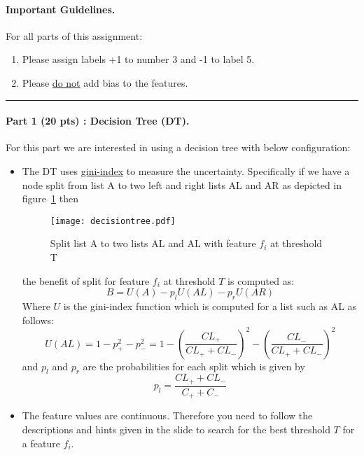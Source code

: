 \documentclass{article}
\begin{document}
{\paragraph{Important Guidelines.} {For all parts of this assignment:
\begin{enumerate}
\item Please assign labels +1 to number 3 and -1 to label 5.
\item Please \underline{do not} add bias to the features.
\end{enumerate}
}
\noindent\rule{16cm}{0.4pt}
\newpage
\paragraph{Part 1 (20 pts) : Decision Tree (DT).} For this part we are interested in using a decision tree with below configuration:
\begin{itemize}
\item The DT uses \underline{gini-index} to measure the uncertainty. Specifically if we have a node split from list A to two left and right lists AL and AR as depicted in figure~\ref{fig:dt_split} then
\begin{figure}[H]
\begin{center}
\texttt{[image: decisiontree.pdf]}
\end{center}
\caption{Split list A to two lists AL and AL with feature $f_i$ at threshold T}
\label{fig:dt_split}
\end{figure}
the benefit of split for feature $f_i$ at threshold $T$ is computed as:
\begin{equation}
B = U(A) - p_l U(AL) - p_r U(AR)
\label{eqpredict}
\end{equation}
Where $U$ is the gini-index function which is computed for a list such as AL as follows:
\begin{equation}
    U(AL) = 1 - p_{+}^{2} - p_{-}^{2} = 1 - (\frac{CL_{+}}{CL_{+} + CL_{-}})^{2} - (\frac{CL_{-}}{CL_{+} + CL_{-}})^{2}
\end{equation}
and $p_l$ and $p_r$ are the probabilities for each split which is given by \\
\begin{equation}
    p_l = \frac{CL_{+} + CL_{-}}{C_{+} + C_{-}}
\end{equation}
\item The feature values are continuous. Therefore you need to follow the descriptions and hints given in the slide to search for the best threshold $T$ for a feature $f_i$.\\

\end{itemize}}
\end{document}
